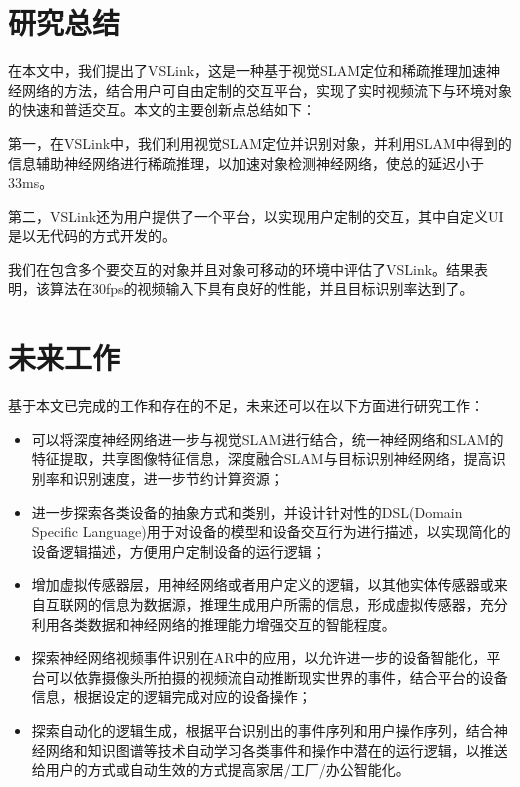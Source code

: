 \section{研究总结}
在本文中，我们提出了VSLink，这是一种基于视觉SLAM定位和稀疏推理加速神经网络的方法，结合用户可自由定制的交互平台，实现了实时视频流下与环境对象的快速和普适交互。本文的主要创新点总结如下：

第一，在VSLink中，我们利用视觉SLAM定位并识别对象，并利用SLAM中得到的信息辅助神经网络进行稀疏推理，以加速对象检测神经网络，使总的延迟小于33ms。

第二，VSLink还为用户提供了一个平台，以实现用户定制的交互，其中自定义UI是以无代码的方式开发的。

我们在包含多个要交互的对象并且对象可移动的环境中评估了VSLink。结果表明，该算法在30fps的视频输入下具有良好的性能，并且目标识别率达到了{\acc}。
\section{未来工作}
基于本文已完成的工作和存在的不足，未来还可以在以下方面进行研究工作：
\begin{itemize}
	\item 可以将深度神经网络进一步与视觉SLAM进行结合，统一神经网络和SLAM的特征提取，共享图像特征信息，深度融合SLAM与目标识别神经网络，提高识别率和识别速度，进一步节约计算资源；
	\item 进一步探索各类设备的抽象方式和类别，并设计针对性的DSL(Domain Specific Language)用于对设备的模型和设备交互行为进行描述，以实现简化的设备逻辑描述，方便用户定制设备的运行逻辑；
	\item 增加虚拟传感器层，用神经网络或者用户定义的逻辑，以其他实体传感器或来自互联网的信息为数据源，推理生成用户所需的信息，形成虚拟传感器，充分利用各类数据和神经网络的推理能力增强交互的智能程度。
	\item 探索神经网络视频事件识别在AR中的应用，以允许进一步的设备智能化，平台可以依靠摄像头所拍摄的视频流自动推断现实世界的事件，结合平台的设备信息，根据设定的逻辑完成对应的设备操作；
	\item 探索自动化的逻辑生成，根据平台识别出的事件序列和用户操作序列，结合神经网络和知识图谱等技术自动学习各类事件和操作中潜在的运行逻辑，以推送给用户的方式或自动生效的方式提高家居/工厂/办公智能化。
\end{itemize}

